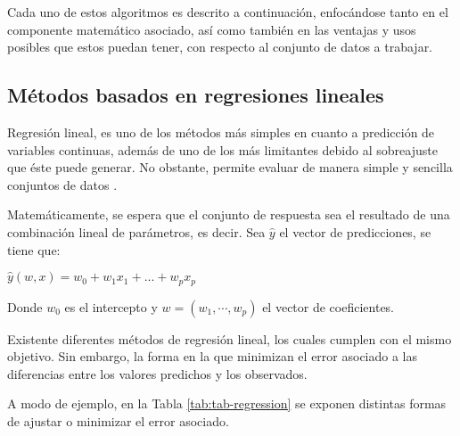 Cada uno de estos algoritmos es descrito a continuación, enfocándose tanto en el componente matemático asociado, así como también en las ventajas y usos posibles que estos puedan tener, con respecto al conjunto de datos a trabajar.

\subsection{Métodos basados en regresiones lineales}

Regresión lineal, es uno de los métodos más simples en cuanto a predicción de variables continuas, además de uno de los más limitantes debido al sobreajuste que éste puede generar. No obstante, permite evaluar de manera simple y sencilla conjuntos de datos \cite{graybill1976theory}. 

Matemáticamente, se espera que el conjunto de respuesta sea el resultado de una combinación lineal de parámetros, es decir. Sea $\hat{y}$ el vector de predicciones, se tiene que:

\begin{center}
	$\hat{y}(w, x) = w_0 + w_1 x_1 + ... + w_p x_p$
\end{center}

Donde $w_0$ es el intercepto y $w = (w_1,\cdots, w_p)$ el vector de coeficientes.

Existente diferentes métodos de regresión lineal, los cuales cumplen con el mismo objetivo. Sin embargo, la forma en la que minimizan el error asociado a las diferencias entre los valores predichos y los observados.

A modo de ejemplo, en la Tabla \ref{tab:tab-regression} se exponen distintas formas de ajustar o minimizar el error asociado.

